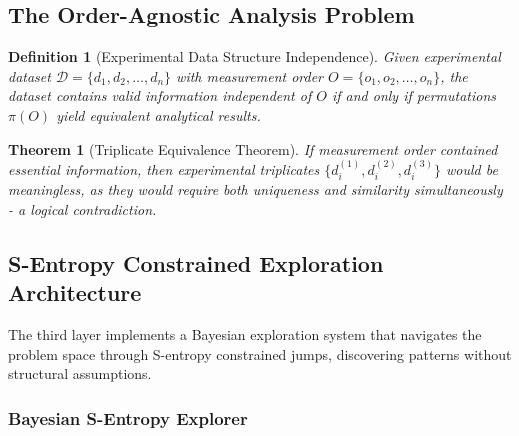 \documentclass[12pt,a4paper]{article}
\newtheorem{theorem}{Theorem}
\newtheorem{definition}{Definition}
\begin{document}
\subsection{The Order-Agnostic Analysis Problem}

\begin{definition}[Experimental Data Structure Independence]
Given experimental dataset $\mathcal{D} = \{d_1, d_2, \ldots, d_n\}$ with measurement order $O = \{o_1, o_2, \ldots, o_n\}$, the dataset contains valid information independent of $O$ if and only if permutations $\pi(O)$ yield equivalent analytical results.
\end{definition}

\begin{theorem}[Triplicate Equivalence Theorem]
If measurement order contained essential information, then experimental triplicates $\{d_i^{(1)}, d_i^{(2)}, d_i^{(3)}\}$ would be meaningless, as they would require both uniqueness and similarity simultaneously - a logical contradiction.
\end{theorem}

\subsection{S-Entropy Constrained Exploration Architecture}

The third layer implements a Bayesian exploration system that navigates the problem space through S-entropy constrained jumps, discovering patterns without structural assumptions.

\subsubsection{Bayesian S-Entropy Explorer}
\end{document}
